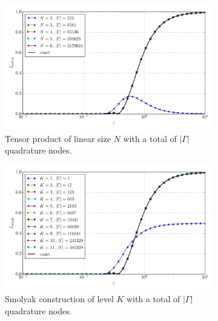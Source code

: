\documentclass[a4paper,10pt]{article}
\begin{document}
\begin{figure}[ht!]
  \begin{subfigure}[t]{0.5\linewidth}
    \includegraphics[width=\linewidth]{./plots/tp_sg_8d_conv_eps_(2,0,0,0,0,0,0,0)_(2,0,0,0,0,0,0,0)_val_nsd_tp.pdf}
    \caption{Tensor product of linear size $N$ with a total of $|\Gamma|$ quadrature nodes.}
    \label{fig:tp_sg_8d_conv_p_20000000_20000000_val_nsd_tp}
  \end{subfigure}
  \begin{subfigure}[t]{0.5\linewidth}
    \includegraphics[width=\linewidth]{./plots/tp_sg_8d_conv_eps_(2,0,0,0,0,0,0,0)_(2,0,0,0,0,0,0,0)_val_nsd_gk.pdf}
    \caption{Smolyak construction of level $K$ with a total of $|\Gamma|$ quadrature nodes.}
    \label{fig:tp_sg_8d_conv_p_20000000_20000000_val_nsd_gk}
  \end{subfigure} \\
  \begin{subfigure}[t]{0.5\linewidth}

\end{subfigure}
\end{figure}
\end{document}
